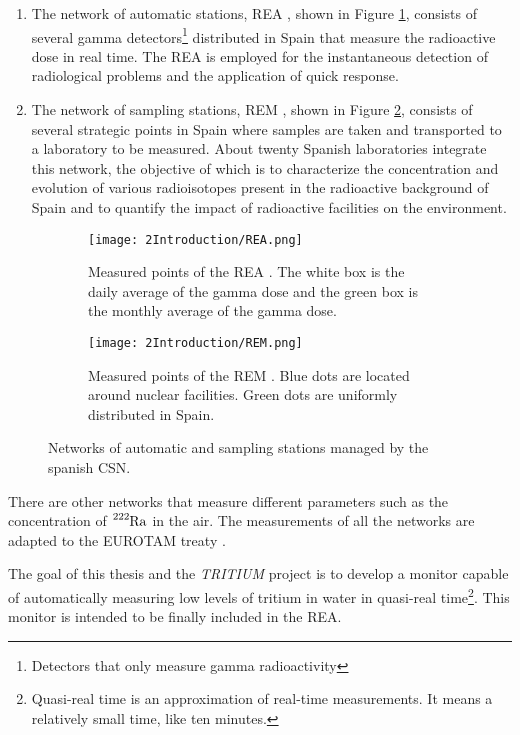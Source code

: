 \begin{enumerate}
\begin{enumerate}
\item{} The network of automatic stations, REA \cite{REA}, shown in Figure \ref{subfig:REA}, consists of several gamma detectors\footnote{Detectors that only measure gamma radioactivity} distributed in Spain that measure the radioactive dose in real time. The REA is employed for the instantaneous detection of radiological problems and the application of quick response.

\item{} The network of sampling stations, REM \cite{REM}, shown in Figure \ref{subfig:REM}, consists of several strategic points in Spain where samples are taken and transported to a laboratory to be measured. About twenty Spanish laboratories integrate this network, the objective of which is to characterize the concentration and evolution of various radioisotopes present in the radioactive background of Spain and to quantify the impact of radioactive facilities on the environment.
\end{enumerate}

\begin{figure}
\centering
    \begin{subfigure}[b]{0.45\textwidth}
    \centering
    \texttt{[image: 2Introduction/REA.png]}  
        \caption{Measured points of the REA \cite{REA}. The white box is the daily average of the gamma dose and the green box is the monthly average of the gamma dose.}\label{subfig:REA}
    \end{subfigure}
    \hfill
    \begin{subfigure}[b]{0.45\textwidth}
    \centering
    \texttt{[image: 2Introduction/REM.png]}  
    \caption{Measured points of the REM \cite{REM}. Blue dots are located around nuclear facilities. Green dots are uniformly distributed in Spain.\label{subfig:REM}}
    \end{subfigure}
 \caption{Networks of automatic and sampling stations managed by the spanish CSN.}
 \label{fig:NetworksCSN}
\end{figure}

There are other networks that measure different parameters such as the concentration of $\ce{^{222}Ra}$ in the air. The measurements of all the networks are adapted to the EUROTAM treaty \cite{100BqL}.
\end{enumerate}

The goal of this thesis and the \textit{TRITIUM} project is to develop a monitor capable of automatically measuring low levels of tritium in water in quasi-real time\footnote{Quasi-real time is an approximation of real-time measurements. It means a relatively small time, like ten minutes.}. This monitor is intended to be finally included in the REA.

